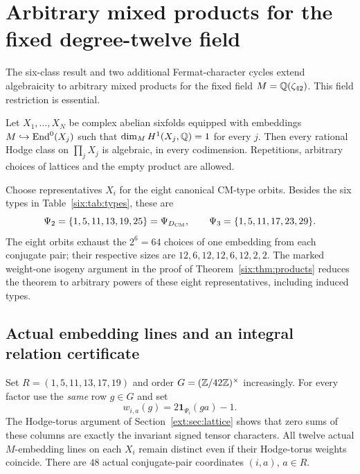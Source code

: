 \section{Arbitrary mixed products for the fixed degree-twelve field}
\label{eight:sec:main}
The six-class result and two additional Fermat-character cycles extend
algebraicity to arbitrary mixed products for the fixed field
$M=\mathbb Q(\zeta_{42})$. This field restriction is essential.
\begin{theorem}\label{eight:thm:all}
Let $X_1,\ldots,X_N$ be complex abelian sixfolds equipped with embeddings
$M\hookrightarrow\operatorname{End}^0(X_j)$ such that $\dim_M H^1(X_j,\mathbb Q)=1$ for every $j$.
Then every rational Hodge class on $\prod_jX_j$ is algebraic,
in every codimension. Repetitions, arbitrary choices of lattices and
the empty product are allowed.
\end{theorem}

Choose representatives $X_i$ for the eight canonical CM-type orbits.
Besides the six types in Table~\ref{six:tab:types}, these are
\[
 \Psi_2=\{1,5,11,13,19,25\}=\Psi_{D_{\mathrm{CM}}},\qquad
 \Psi_3=\{1,5,11,17,23,29\}.
\]
The eight orbits exhaust the $2^6=64$ choices of one embedding from
each conjugate pair; their respective sizes are
$12,6,12,12,6,12,2,2$. The marked weight-one isogeny argument in the
proof of Theorem~\ref{six:thm:products} reduces the theorem to arbitrary
powers of these eight representatives, including induced types.

\subsection{Actual embedding lines and an integral relation certificate}
\label{eight:sec:lattice}
Set $R=(1,5,11,13,17,19)$ and order $G=(\mathbb Z/42\mathbb Z)^\times$ increasingly.
For every factor use the \emph{same} row $g\in G$ and set
\[
 w_{i,a}(g)=2\mathbf1_{\Psi_i}(ga)-1.
\]
The Hodge-torus argument of Section~\ref{ext:sec:lattice} shows that
zero sums of these columns are exactly the invariant signed tensor
characters. All twelve actual $M$-embedding lines on each $X_i$ remain
distinct even if their Hodge-torus weights coincide.
There are $48$ actual conjugate-pair coordinates $(i,a)$, $a\in R$.


